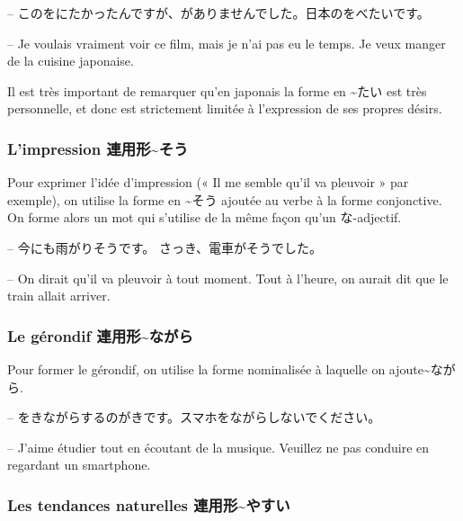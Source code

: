\begin{tcolorbox}
    -- このをにたかったんですが、がありませんでした。日本のをべたいです。

    -- Je voulais vraiment voir ce film, mais je n'ai pas eu le temps. Je veux manger de la cuisine japonaise.
\end{tcolorbox}

Il est très important de remarquer qu'en japonais la forme en \~{}たい est très personnelle, et donc est strictement limitée à l'expression de ses propres désirs.

\subsubsection{L'impression 連用形\~{}そう}

Pour exprimer l'idée d'impression (« Il me semble qu'il va pleuvoir » par exemple), on utilise la forme en \~{}そう ajoutée au verbe à la forme conjonctive. On forme alors un mot qui s'utilise de la même façon qu'un な-adjectif.

\begin{tcolorbox}
    -- 今にも雨がりそうです。 さっき、電車がそうでした。

    -- On dirait qu'il va pleuvoir à tout moment. Tout à l’heure, on aurait dit que le train allait arriver.
\end{tcolorbox}


\subsubsection{Le gérondif 連用形\~{}ながら}

Pour former le gérondif, on utilise la forme nominalisée à laquelle on ajoute\~{}ながら.

\begin{tcolorbox}
    -- をきながらするのがきです。スマホをながらしないでください。

    -- J'aime étudier tout en écoutant de la musique. Veuillez ne pas conduire en regardant un smartphone.
\end{tcolorbox}

\subsubsection{Les tendances naturelles 連用形\~{}やすい}

